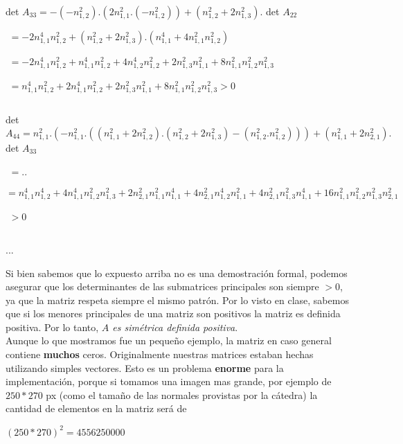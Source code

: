 {\setlength{\baselineskip}{2em}
det $A_{33} = -(-n_{1,2}^2).(2 n_{1,1}^2 . (-n_{1,2}^2)) + (n_{1,2}^2 + 2 n_{1,3}^2) . $ det $A_{22}$

$ $ \hspace{30pt} $= -2 n_{1,1}^4 n_{1,2}^2 + (n_{1,2}^2 + 2 n_{1,3}^2) . (n_{1,1}^4 + 4 n_{1,1}^2 n_{1,2}^2)$

$ $ \hspace{30pt} $= -2 n_{1,1}^4 n_{1,2}^2 + n_{1,1}^4 n_{1,2}^2 + 4 n_{1,2}^4 n_{1,2}^2 + 2 n_{1,3}^2 n_{1,1}^2 + 8 n_{1,1}^2 n_{1,2}^2 n_{1,3}^2$

$ $ \hspace{30pt} $= n_{1,1}^4 n_{1,2}^2 + 2 n_{1,1}^4 n_{1,2}^2 + 2 n_{1,3}^2 n_{1,1}^2 + 8 n_{1,1}^2 n_{1,2}^2 n_{1,3}^2 > 0$

$ $ \hspace{30pt}
}


{\setlength{\baselineskip}{2em}
det $A_{44} = n_{1,1}^2 . ( -n_{1,1}^2 . (  (n_{1,1}^2 + 2 n_{1,2}^2) . (n_{1,2}^2 + 2 n_{1,3}^2) - (n_{1,2}^2 . n_{1,2}^2 ) ) ) + (n_{1,1}^2 + 2 n_{2,1}^2) .$ det $A_{33}$

$ $ \hspace{30pt} $= .. $

$ $ \hspace{30pt} $= n_{1,1}^4 n_{1,2}^4 + 4 n_{1,1}^4 n_{1,2}^2 n_{1,3}^2 + 2 n_{2,1}^2 n_{1,1}^2 n_{1,1}^4 + 4 n_{2,1}^2 n_{1,2}^4 n_{1,1}^2 + 4 n_{2,1}^2 n_{1,3}^2 n_{1,1}^4 + 16 n_{1,1}^2 n_{1,2}^2 n_{1,3}^2 n_{2,1}^2$

$ $ \hspace{30pt} $> 0$

$ $ \hspace{30pt}
}

...

Si bien sabemos que lo expuesto arriba no es una demostración formal, podemos asegurar que los determinantes de las submatrices principales son siempre $> 0$, ya que la matriz respeta siempre el mismo patrón. Por lo visto en clase, sabemos que si los menores principales de una matriz son positivos la matriz es definida positiva. Por lo tanto, \textit{$A$ es simétrica definida positiva}. \\

Aunque lo que mostramos fue un pequeño ejemplo, la matriz en caso general contiene \textbf{muchos} ceros. Originalmente nuestras matrices estaban hechas utilizando simples vectores. Esto es un problema \textbf{enorme} para la implementación, porque si tomamos una imagen mas grande, por ejemplo de $250*270$ px (como el tamaño de las normales provistas por la cátedra) la cantidad de elementos en la matriz será de
\begin{center}
    $(250*270)^2 = 4 556 250 000$
\end{center}

